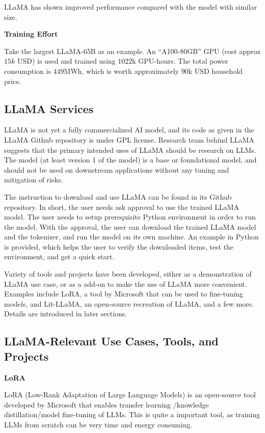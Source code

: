 LLaMA has shown improved performance compared with the model with similar size.

\vspace{0.1in}
\noindent \textbf{Training Effort}
\vspace{0.1in}

Take the largest LLaMA-65B as an example. An ``A100-80GB'' GPU (cost approx $15k$ USD) is used and trained using $1022$k GPU-hours. The total power consumption is $449$MWh, which is worth approximately $90$k USD household price.

\subsection{LLaMA Services}

LLaMA is not yet a fully commercialized AI model, and its code as given in the LLaMA Github repository is under GPL license. Research team behind LLaMA suggests that the primary intended uses of LLaMA should be research on LLMs. The model (at least version 1 of the model) is a base or foundational model, and should not be used on downstream applications without any tuning and mitigation of risks.

The instruction to download and use LLaMA can be found in its Github repository. In short, the user needs ask approval to use the trained LLaMA model. The user needs to setup prerequisite Python environment in order to run the model. With the approval, the user can download the trained LLaMA model and the tokenizer, and run the model on its own machine. An example in Python is provided, which helps the user to verify the downloaded items, test the environment, and get a quick start.

Variety of tools and projects have been developed, either as a demonstration of LLaMA use case, or as a add-on to make the use of LLaMA more convenient. Examples include LoRA, a tool by Microsoft that can be used to fine-tuning models, and Lit-LLaMA, an open-source recreation of LLaMA, and a few more. Details are introduced in later sections.

\subsection{LLaMA-Relevant Use Cases, Tools, and Projects}

\vspace{0.1in}
\noindent \textbf{LoRA}
\vspace{0.1in}

LoRA (Low-Rank Adaptation of Large Language Models) is an open-source tool developed by Microsoft that enables transfer learning /knowledge distillation/model fine-tuning of LLMs. This is quite a important tool, as training LLMs from scratch can be very time and energy consuming.

